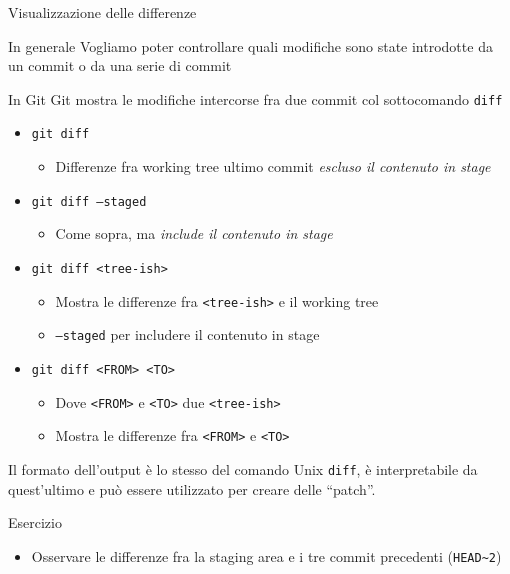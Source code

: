 \documentclass[xcolor=dvipsnames,presentation]{beamer}
\begin{document}
\begin{frame}{Visualizzazione delle differenze}
    \begin{block}{In generale}
        Vogliamo poter controllare quali modifiche sono state introdotte da un commit o da una serie di commit
    \end{block}
    \begin{block}{In Git}
        Git mostra le modifiche intercorse fra due commit col sottocomando \texttt{diff}
        \begin{itemize}
            \item \texttt{git diff}
            \begin{itemize}
                \item Differenze fra working tree ultimo commit \textit{escluso il contenuto in stage}
            \end{itemize}
            \item \texttt{git diff --staged}
            \begin{itemize}
                \item Come sopra, ma \textit{include il contenuto in stage}
            \end{itemize}
            \item \texttt{git diff <tree-ish>}
            \begin{itemize}
                \item Mostra le differenze fra \texttt{<tree-ish>} e il working tree
                \item \texttt{--staged} per includere il contenuto in stage
            \end{itemize}
            \item \texttt{git diff <FROM> <TO>}
            \begin{itemize}
                \item Dove \texttt{<FROM>} e \texttt{<TO>} due \texttt{<tree-ish>}
                \item Mostra le differenze fra \texttt{<FROM>} e \texttt{<TO>}
            \end{itemize}
        \end{itemize}
        Il formato dell'output è lo stesso del comando Unix \texttt{diff}, è interpretabile da quest'ultimo e può essere utilizzato per creare delle ``patch''.
    \end{block}
    \begin{block}{Esercizio}
        \begin{itemize}
            \item Osservare le differenze fra la staging area e i tre commit precedenti (\texttt{HEAD\textasciitilde{}2})

\end{itemize}
\end{block}
\end{frame}
\end{document}
